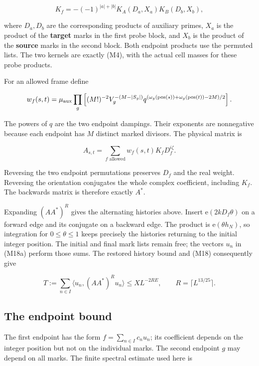 \[
K_f=-(-1)^{|a|+|b|}K_A(D_a,X_a)K_B(D_b,X_b),
\]

where \(D_a,D_b\) are the corresponding products of auxiliary primes,
\(X_a\) is the product of the \textbf{target} marks in the first probe
block, and \(X_b\) is the product of the \textbf{source} marks in the
second block. Both endpoint products use the permuted lists. The two
kernels are exactly (M4), with the actual cell masses for these probe
products.

For an allowed frame define

\[
w_f(s,t)=\mu_{\rm aux}\prod_g
 \left[(M!)^{-2}V_g^{-(M-|S_g|)}
 q^{(\omega_g(\operatorname{pos}(s))+
       \omega_g(\operatorname{pos}(t))-2M)/2}\right].
\]

The powers of \(q\) are the two endpoint dampings. Their exponents are
nonnegative because each endpoint has \(M\) distinct marked divisors.
The physical matrix is

\[
A_{s,t}=\sum_{f\text{ allowed}}w_f(s,t)K_fD_f^{i\zeta}. \tag{M18c}
\]

Reversing the two endpoint permutations preserves \(D_f\) and the real
weight. Reversing the orientation conjugates the whole complex
coefficient, including \(K_f\). The backwards matrix is therefore
exactly \(A^*\).

Expanding \((AA^*)^R\) gives the alternating histories above. Insert
\(\mathrm e(2kD_f\theta)\) on a forward edge and its conjugate on a
backward edge. The product is \(\mathrm e(\theta h_N)\), so integration
for \(0\le\theta\le1\) keeps precisely the histories returning to the
initial integer position. The initial and final mark lists remain free;
the vectors \(u_n\) in (M18a) perform those sums. The restored history
bound and (M18) consequently give

\[
T:=\sum_{n\in I}\langle u_n,(AA^*)^Ru_n\rangle
\le XL^{-2RE},\qquad R=\lceil L^{13/25}\rceil. \tag{M19}
\]


\hypertarget{marked-correlation-the-endpoint-bound}{%
\subsection{The endpoint
bound}\label{marked-correlation-the-endpoint-bound}}

The first endpoint has the form \(f=\sum_{n\in I}c_nu_n\); its
coefficient depends on the integer position but not on the individual
marks. The second endpoint \(g\) may depend on all marks. The finite
spectral estimate used here is

